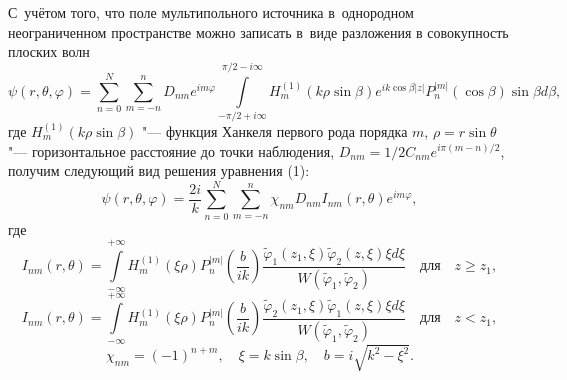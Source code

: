 С~учётом того,  что поле мультипольного
источника в~однородном неограниченном пространстве
можно записать в~виде разложения в совокупность плоских волн
$$\psi(r, \theta, \varphi)=\sum \limits_{n=0}^{N}\sum \limits_{m=-n}^{n}D_{nm}e^{im\varphi}\int\limits_{-\pi/2+i\infty}^{\pi/2-i\infty}H_{m}^{(1)}(k\rho\sin\beta)e^{ik\cos\beta|z|}P_{n}^{|m|}(\cos\beta)\sin\beta
d\beta, $$ где $H_{m}^{(1)}(k\rho\sin\beta)$  "---  функция Ханкеля
первого рода порядка $m$,  $\rho=r\sin\theta$  "---  горизонтальное
расстояние до точки наблюдения,  $D_{nm}=1/2C_{nm}e^{i\pi(m-n)/2}$,
получим следующий вид решения уравнения (1):
\begin {equation}
\psi(r, \theta, \varphi)=\frac{2i}{k}\sum \limits_{n=0}^{N}\sum
\limits_{m=-n}^{n}\chi_{nm}D_{nm}I_{nm}(r, \theta)e^{im\varphi},
\end {equation}
где
$$I_{nm}(r, \theta)=\displaystyle\int\limits_{-\infty}^{+\infty}H_{m}^{(1)}(\xi\rho)P_{n}^{|m|}(\frac{b}{ik})\frac{\widetilde{\varphi}_{1}(z_{1}, \xi)\widetilde{\varphi}_{2}(z, \xi)\xi
d\xi}{W(\widetilde{\varphi}_{1}, \widetilde{\varphi}_{2})}\quad  \text{для} \quad z\geq z_{1},
$$
$$
I_{nm}(r, \theta)=\displaystyle\int\limits_{-\infty}^{+\infty}H_{m}^{(1)}(\xi\rho)P_{n}^{|m|}(\frac{b}{ik})\frac{\widetilde{\varphi}_{2}(z_{1}, \xi)\widetilde{\varphi}_{1}(z, \xi)\xi
d\xi}{W(\widetilde{\varphi}_{1}, \widetilde{\varphi}_{2})}\quad \text{для} \quad  z <
z_{1},$$
$$\chi_{nm}=(-1)^{n+m},\quad   \xi=k\sin\beta,\quad  b=i\sqrt{k^{2}-\xi^{2}}.$$


